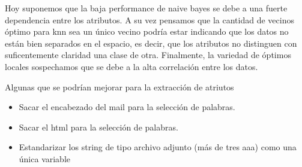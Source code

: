 \documentclass[a4paper,10pt]{article}
\begin{document}
Hoy suponemos que la baja performance de naive bayes se debe a una fuerte dependencia entre los atributos. A su vez pensamos que la cantidad de vecinos \'optimo para knn sea un \'unico vecino podr\'ia estar indicando que los datos no est\'an bien separados en el espacio, es decir, que los atributos no distinguen con suficentemente claridad una clase de otra. Finalmente, la variedad de \'optimos locales sospechamos que se debe a la alta correlaci\'on entre los datos. 

Algunas que se podr\'ian mejorar para la extracci\'on de atriutos 

\begin{itemize}
 \item Sacar el encabezado del mail para la selecci\'on de palabras. 
 \item Sacar el html para la selecci\'on de palabras. 
 \item Estandarizar los string de tipo archivo adjunto (m\'as de tres aaa) como una \'unica variable 
\end{itemize}




\scriptsize


\end{document}
